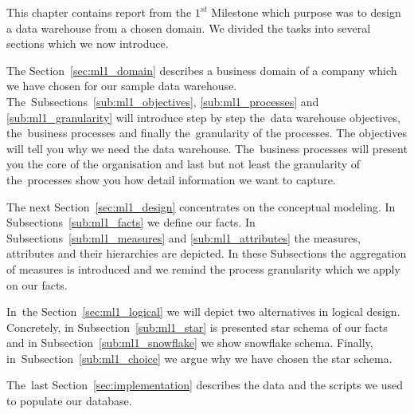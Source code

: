 
This chapter contains report from the $1^{st}$  Milestone which purpose was to design a data warehouse from a chosen domain. We divided the tasks into several sections which we now introduce.

The Section~\ref{sec:ml1_domain} describes a business domain of a company which we have chosen for our sample data warehouse. The~Subsections~\ref{sub:ml1_objectives}, \ref{sub:ml1_processes} and \ref{sub:ml1_granularity} will introduce  step by step the~data warehouse objectives, the~business processes and finally the~granularity of the processes. The objectives will tell you why we need the data warehouse. The~business processes will present you the core of the organisation and last but not least the granularity of the~processes show you how detail information we want to capture.

The next Section~\ref{sec:ml1_design} concentrates on the conceptual modeling. In Subsections~\ref{sub:ml1_facts} we define our facts. In Subsections~\ref{sub:ml1_measures} and \ref{sub:ml1_attributes} the measures, attributes and their hierarchies are depicted. In these Subsections the aggregation of measures is introduced and we remind the process granularity which we apply on our facts.

In~the Section~\ref{sec:ml1_logical} we will depict two alternatives in logical design. Concretely, in Subsection~\ref{sub:ml1_star} is presented star schema of our facts and in Subsection~\ref{sub:ml1_snowflake} we show snowflake schema. Finally, in~Subsection~\ref{sub:ml1_choice} we argue why we have chosen the star schema. 

The~last Section~\ref{sec:implementation} describes the data and the scripts we used to populate our database. 
